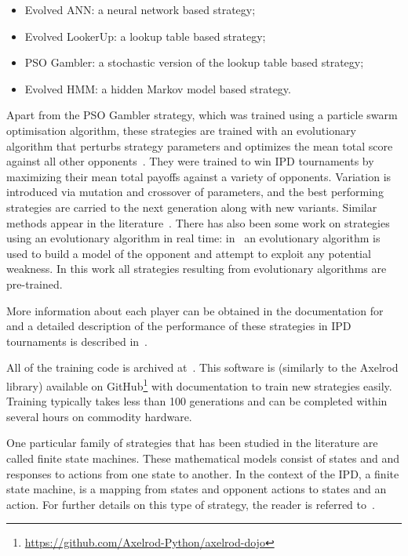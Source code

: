 \documentclass[10pt,letterpaper]{article}
\begin{document}
\begin{itemize}
    \item Evolved ANN: a neural network based strategy;
    \item Evolved LookerUp: a lookup table based strategy;
    \item PSO Gambler: a stochastic version of the lookup table based strategy;
    \item Evolved HMM: a hidden Markov model based strategy.
\end{itemize}

Apart from the PSO Gambler strategy, which was trained using a particle swarm
optimisation algorithm, these strategies are trained with an evolutionary
algorithm that perturbs strategy parameters and optimizes the mean total score
against all other opponents~\cite{affenzeller2009genetic}. They were trained to
win IPD tournaments by maximizing their mean total payoffs against a variety
of opponents. Variation is
introduced via mutation and crossover of parameters, and the best performing
strategies are carried to the next generation along with new variants. Similar
methods appear in the literature~\cite{Ashlock2006}.
There has also been some work on strategies using an evolutionary algorithm in real time:
in~\cite{Gaudesi2016}
an evolutionary algorithm is used to build a model of the opponent and attempt
to exploit any potential weakness. In this work all strategies resulting from
evolutionary algorithms are pre-trained.

More information about each player can be obtained in the documentation for
\cite{axelrodproject} and a detailed description of the performance
of these strategies in IPD tournaments is described in~\cite{Harper2017}.

All of the training code is archived at~\cite{marc_harper_2017_824264}. This
software is (similarly to the Axelrod library) available on
GitHub\footnote{\url{https://github.com/Axelrod-Python/axelrod-dojo}}
with documentation to
train new strategies easily. Training
typically takes less than 100 generations and can be completed within several
hours on commodity hardware.

One particular family of strategies that has been studied in the literature are
called finite state machines. These mathematical models consist of states and
and responses to actions from one state to another. In the context of the IPD, a
finite state machine, is a mapping from states and opponent actions to states
and an action. For further details on this type of strategy, the reader is
referred to~\cite{Ashlock2006, Harper2017}.
\end{document}
